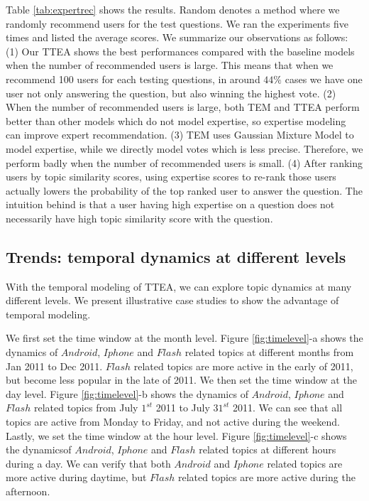 {{{{{{{Table \ref{tab:expertrec} shows the results. Random denotes a method where we randomly recommend users for the test questions. We ran the experiments five times and listed the average scores. We summarize our observations as follows: (1) Our TTEA shows the best performances compared with the baseline models when the number of recommended users is large. This means that when we recommend 100 users for each testing questions, in around $44\%$ cases we have one user not only answering the question, but also winning the highest vote. (2) When the number of recommended users is large, both TEM and TTEA perform better than other models which do not model expertise, so expertise modeling can improve expert recommendation. (3) TEM uses Gaussian Mixture Model to model expertise, while we directly model votes which is less precise. Therefore, we perform badly when the number of recommended users is small. (4) After ranking users by topic similarity scores, using expertise scores to re-rank those users actually lowers the probability of the top ranked user to answer the question. The intuition behind is that a user having high expertise on a question does not necessarily have high topic similarity score with the question.

\subsection{Trends: temporal dynamics at different levels}
With the temporal modeling of TTEA, we can explore topic dynamics at many different levels. We present illustrative case studies to show the advantage of temporal modeling.

We first set the time window at the month level. Figure \ref{fig:timelevel}-a shows the dynamics of $Android$, $Iphone$ and $Flash$ related topics at different months from Jan 2011 to Dec 2011. $Flash$ related topics are more active in the early of 2011, but become less popular in the late of 2011. We then set the time window at the day level. Figure \ref{fig:timelevel}-b shows the dynamics of $Android$, $Iphone$ and $Flash$ related topics from July $1^{st}$ 2011 to July $31^{st}$ 2011. We can see that all topics are active from Monday to Friday, and not active during the weekend. Lastly, we set the time window at the hour level. Figure \ref{fig:timelevel}-c shows the  dynamicsof  $Android$, $Iphone$ and $Flash$ related topics at different hours during a day. We can verify that both $Android$ and $Iphone$ related topics are more active during daytime, but $Flash$ related topics are more active during the afternoon.

}}}}}}}
